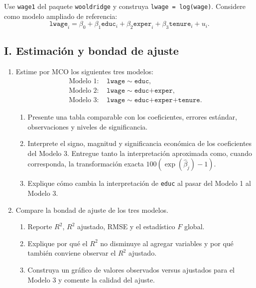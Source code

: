 \documentclass[letterpaper,11pt]{article}
\begin{document}
Use \texttt{wage1} del paquete \texttt{wooldridge} y construya
\texttt{lwage = log(wage)}. Considere como modelo ampliado de referencia:
\[
    \texttt{lwage}_i=\beta_0+\beta_1\texttt{educ}_i
    +\beta_2\texttt{exper}_i+\beta_3\texttt{tenure}_i+u_i.
\]

\subsection*{I. Estimación y bondad de ajuste}

\begin{enumerate}

\item Estime por MCO los siguientes tres modelos:
    \begin{align*}
        \text{Modelo 1: }&\texttt{lwage}\sim\texttt{educ},\\
        \text{Modelo 2: }&\texttt{lwage}\sim\texttt{educ+exper},\\
        \text{Modelo 3: }&\texttt{lwage}\sim\texttt{educ+exper+tenure}.
    \end{align*}
    \begin{enumerate}[label=(\alph*)]
        \item Presente una tabla comparable con los coeficientes, errores
              estándar, observaciones y niveles de significancia.
        \item Interprete el signo, magnitud y significancia económica de los
              coeficientes del Modelo 3. Entregue tanto la interpretación
              aproximada como, cuando corresponda, la transformación exacta
              $100(\exp(\widehat\beta_j)-1)$.
        \item Explique cómo cambia la interpretación de \texttt{educ} al pasar
              del Modelo 1 al Modelo 3.
    \end{enumerate}

\item Compare la bondad de ajuste de los tres modelos.
    \begin{enumerate}[label=(\alph*)]
        \item Reporte $R^2$, $R^2$ ajustado, RMSE y el estadístico $F$ global.
        \item Explique por qué el $R^2$ no disminuye al agregar variables y por
              qué también conviene observar el $R^2$ ajustado.
        \item Construya un gráfico de valores observados versus ajustados para
              el Modelo 3 y comente la calidad del ajuste.
    \end{enumerate}

\end{enumerate}
\end{document}
